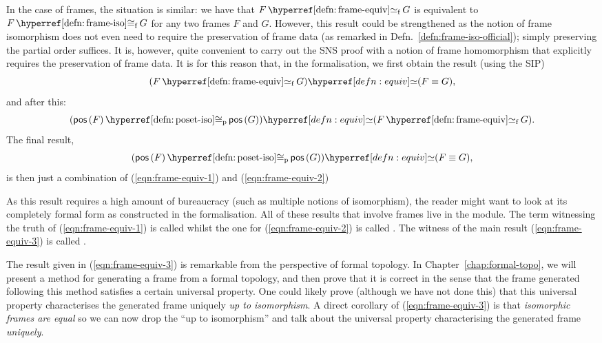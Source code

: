 In the case of frames, the situation is similar: we have that $\frameequiv{F}{G}$ is
equivalent to $\frameiso{F}{G}$ for any two frames $F$ and $G$. However, this result could
be strengthened as the notion of frame isomorphism does not even need to require the
preservation of frame data (as remarked in Defn.~\ref{defn:frame-iso-official}); simply
preserving the partial order suffices. It is, however, quite convenient to carry out the
SNS proof with a notion of frame homomorphism that explicitly requires the preservation of
frame data. It is for this reason that, in the \veragda{} formalisation, we first obtain
the result (using the SIP)
\begin{equation}\label{eqn:frame-equiv-1}
  \typequiv{(\frameequiv{F}{G})}{(F \equiv G)},
\end{equation}
and after this:
\begin{equation}\label{eqn:frame-equiv-2}
  \typequiv{(\posetiso{\posof{F}}{\posof{G}})}{(\frameequiv{F}{G})}.
\end{equation}
The final result,
\begin{equation}\label{eqn:frame-equiv-3}
  \typequiv{(\posetiso{\posof{F}}{\posof{G}})}{(F \equiv G)},
\end{equation}
is then just a combination of (\ref{eqn:frame-equiv-1}) and (\ref{eqn:frame-equiv-2})

As this result requires a high amount of bureaucracy (such as multiple notions of
isomorphism), the reader might want to look at its completely formal form as constructed
in the \veragda{} formalisation. All of these results that involve frames live in the
 module. The term witnessing the truth of (\ref{eqn:frame-equiv-1}) is
called  whilst the one for (\ref{eqn:frame-equiv-2}) is called
. The witness of the main result (\ref{eqn:frame-equiv-3}) is called
.

The result given in (\ref{eqn:frame-equiv-3}) is remarkable from the perspective of formal
topology. In Chapter~\ref{chap:formal-topo}, we will present a method for generating a
frame from a formal topology, and then prove that it is correct in the sense that the
frame generated following this method satisfies a certain universal property. One could
likely prove (although we have not done this) that this universal property characterises
the generated frame uniquely \emph{up to isomorphism}. A direct corollary of
(\ref{eqn:frame-equiv-3}) is that \emph{isomorphic frames are equal} so we can now drop
the ``up to isomorphism'' and talk about the universal property characterising the
generated frame \emph{uniquely}.

